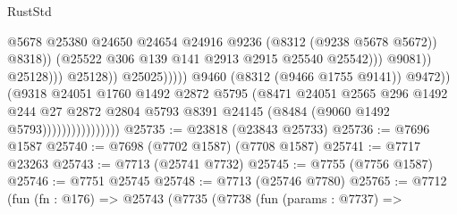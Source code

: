 \begin{lexlean}{RustStd}
\begin{coremodule}
                                                                @5678
                                                                @25380
                                                                @24650
                                                                @24654
                                                                @24916
                                                                @9236
                                                                (@8312 (@9238 @5678 @5672))
                                                                @8318))
                                                            (@25522
                                                              @306
                                                              @139
                                                              @141
                                                              @2913
                                                              @2915
                                                              @25540
                                                              @25542)))
                                                        @9081))
                                                    @25128)))
                                              @25128))
                                          @25025)))))
                                @9460
                                (@8312 (@9466 @1755 @9141))
                                @9472))
                            (@9318
                              @24051
                              @1760
                              @1492
                              @2872
                              @5795
                              (@8471
                                @24051
                                @2565
                                @296
                                @1492
                                @244
                                @27
                                @2872
                                @2804
                                @5793
                                @8391
                                @24145
                                (@8484 (@9060 @1492 @5793))))))))))))))))
@25735 := @23818 (@23843 @25733)
@25736 := @7696 @1587
@25740 := @7698 (@7702 @1587) (@7708 @1587)
@25741 := @7717 @23263
@25743 := @7713 (@25741 @7732)
@25745 := @7755 (@7756 @1587)
@25746 := @7751 @25745
@25748 := @7713 (@25746 @7780)
@25765 := @7712
    (fun (fn : @176) =>
    @25743
      (@7735
        (@7738
          (fun (params : @7737) =>

\end{coremodule}
\end{lexlean}
